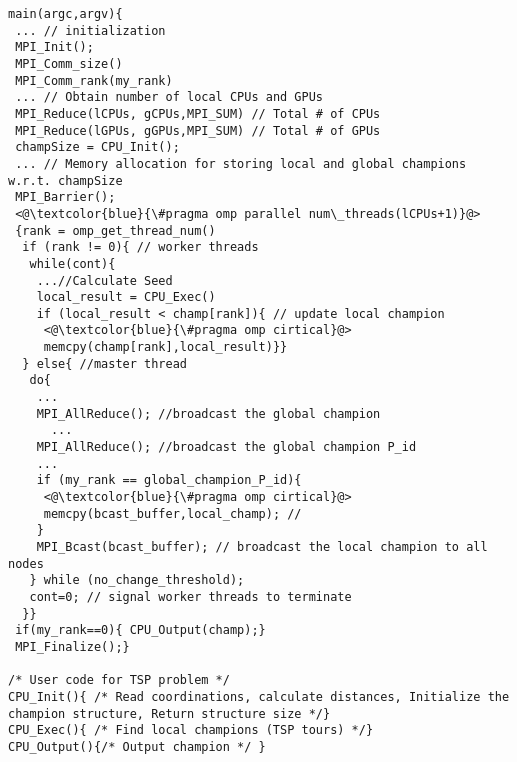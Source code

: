 \begin{frame}{}
  \lstset{language=C}
 \begin{lstlisting}[caption={ILCS Overview},label={lst:ilcs}]
main(argc,argv){
 ... // initialization
 MPI_Init();
 MPI_Comm_size()
 MPI_Comm_rank(my_rank)
 ... // Obtain number of local CPUs and GPUs
 MPI_Reduce(lCPUs, gCPUs,MPI_SUM) // Total # of CPUs
 MPI_Reduce(lGPUs, gGPUs,MPI_SUM) // Total # of GPUs
 champSize = CPU_Init();
 ... // Memory allocation for storing local and global champions w.r.t. champSize
 MPI_Barrier();
 <@\textcolor{blue}{\#pragma omp parallel num\_threads(lCPUs+1)}@>
 {rank = omp_get_thread_num()
  if (rank != 0){ // worker threads
   while(cont){
    ...//Calculate Seed
    local_result = CPU_Exec()
    if (local_result < champ[rank]){ // update local champion
     <@\textcolor{blue}{\#pragma omp cirtical}@>
     memcpy(champ[rank],local_result)}}
  } else{ //master thread
   do{
    ...
    MPI_AllReduce(); //broadcast the global champion 
	  ...
    MPI_AllReduce(); //broadcast the global champion P_id
    ...
    if (my_rank == global_champion_P_id){
     <@\textcolor{blue}{\#pragma omp cirtical}@>
     memcpy(bcast_buffer,local_champ); // 
    }
    MPI_Bcast(bcast_buffer); // broadcast the local champion to all nodes
   } while (no_change_threshold);
   cont=0; // signal worker threads to terminate
  }}
 if(my_rank==0){ CPU_Output(champ);}
 MPI_Finalize();}

/* User code for TSP problem */
CPU_Init(){ /* Read coordinations, calculate distances, Initialize the champion structure, Return structure size */}
CPU_Exec(){ /* Find local champions (TSP tours) */}
CPU_Output(){/* Output champion */ }
\end{lstlisting}
\end{frame}
